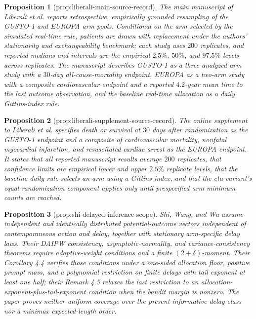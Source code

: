 \documentclass{article}
\newtheorem{proposition}{Proposition}
\begin{document}
\begin{proposition}[prop:liberali-main-source-record]\label{prop:liberali-main-source-record}
The main manuscript of Liberali et al. reports retrospective, empirically grounded resampling of the GUSTO-1 and EUROPA arm pools.  Conditional on the arm selected by the simulated real-time rule, patients are drawn with replacement under the authors' stationarity and exchangeability benchmark; each study uses \(200\) replicates, and reported medians and intervals are the empirical \(2.5\%\), \(50\%\), and \(97.5\%\) levels across replicates.  The manuscript describes GUSTO-1 as a three-analyzed-arm study with a \(30\)-day all-cause-mortality endpoint, EUROPA as a two-arm study with a composite cardiovascular endpoint and a reported \(4.2\)-year mean time to the last outcome observation, and the baseline real-time allocation as a daily Gittins-index rule.
\end{proposition}

\begin{proposition}[prop:liberali-supplement-source-record]\label{prop:liberali-supplement-source-record}
The online supplement to Liberali et al. specifies death or survival at \(30\) days after randomization as the GUSTO-1 endpoint and a composite of cardiovascular mortality, nonfatal myocardial infarction, and resuscitated cardiac arrest as the EUROPA endpoint.  It states that all reported manuscript results average \(200\) replicates, that confidence limits are empirical lower and upper \(2.5\%\) replicate levels, that the baseline daily rule selects an arm using a Gittins index, and that the eta-variant's equal-randomization component applies only until prespecified arm minimum counts are reached.
\end{proposition}

\begin{proposition}[prop:shi-delayed-inference-scope]\label{prop:shi-delayed-inference-scope}
Shi, Wang, and Wu assume independent and identically distributed potential-outcome vectors independent of contemporaneous action and delay, together with stationary arm-specific delay laws.  Their DAIPW consistency, asymptotic-normality, and variance-consistency theorems require adaptive-weight conditions and a finite \((2+\delta)\)-moment.  Their Corollary 4.4 verifies those conditions under a one-sided allocation floor, positive prompt mass, and a polynomial restriction on finite delays with tail exponent at least one half; their Remark 4.5 relaxes the last restriction to an allocation-exponent-plus-tail-exponent condition when the bandit margin is nonzero.  The paper proves neither uniform coverage over the present informative-delay class nor a minimax expected-length order.
\end{proposition}
\end{document}
